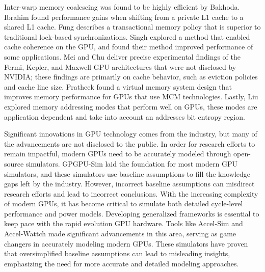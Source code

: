 \documentclass[conference]{IEEEtran}
\begin{document}
Inter-warp memory coalescing was found to be highly efficient by Bakhoda.
Ibrahim found performance gains when shifting from a private L1 cache to a shared L1 cache.
Fung describes a transactional memory policy that is superior to traditional lock-based synchronizations.
Singh explored a method that enabled cache coherence on the GPU, and found their method improved performance of some applications.
Mei and Chu deliver precise experimental findings of the Fermi, Kepler, and Maxwell GPU architectures that were not disclosed by NVIDIA; these findings are primarily on cache behavior, such as eviction policies and cache line size.
Pratheek found a virtual memory system design that improves memory performance for GPUs that use MCM technologies.
Lastly, Liu explored memory addressing modes that perform well on GPUs, these modes are application dependent and take into account an addresses bit entropy region.

Significant innovations in GPU technology comes from the industry, but many of the advancements are not disclosed to the public.
In order for research efforts to remain impactful, modern GPUs need to be accurately modeled through open-source simulators.
GPGPU-Sim laid the foundation for most modern GPU simulators, and these simulators use baseline assumptions to fill the knowledge gaps left by the industry.
However, incorrect baseline assumptions can misdirect research efforts and lead to incorrect conclusions.
With the increasing complexity of modern GPUs, it has become critical to simulate both detailed cycle-level performance and power models.
Developing generalized frameworks is essential to keep pace with the rapid evolution GPU hardware.
Tools like Accel-Sim and Accel-Wattch made significant advancements in this area, serving as game changers in accurately modeling modern GPUs.
These simulators have proven that oversimplified baseline assumptions can lead to misleading insights, emphasizing the need for more accurate and detailed modeling approaches.

\clearpage


\end{document}
